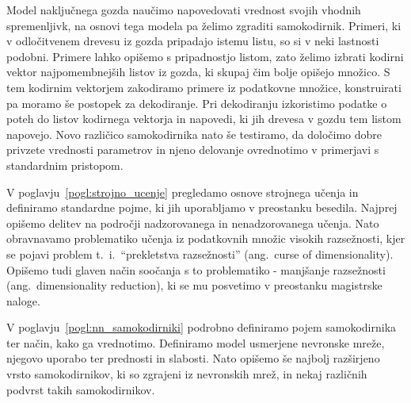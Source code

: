 \documentclass[12pt,a4paper,twoside]{article}
\theoremstyle{definition} %
\theoremstyle{plain} %
\numberwithin{equation}{section}  %
\begin{document}
Model naključnega gozda naučimo napovedovati vrednost svojih vhodnih spremenljivk, na osnovi tega modela pa želimo zgraditi samokodirnik.
Primeri, ki v odločitvenem drevesu iz gozda pripadajo istemu listu, so si v neki lastnosti podobni.
Primere lahko opišemo s pripadnostjo listom, zato želimo izbrati kodirni vektor najpomembnejših listov iz gozda, ki skupaj čim bolje opišejo množico.
S tem kodirnim vektorjem zakodiramo primere iz podatkovne množice, konstruirati pa moramo še postopek za dekodiranje.
Pri dekodiranju izkoristimo podatke o poteh do listov kodirnega vektorja in napovedi, ki jih drevesa v gozdu tem listom napovejo.
Novo različico samokodirnika nato še testiramo, da določimo dobre privzete vrednosti parametrov in njeno delovanje ovrednotimo v primerjavi s standardnim pristopom.


V poglavju~\ref{pogl:strojno_ucenje} pregledamo osnove strojnega učenja in definiramo standardne pojme, ki jih uporabljamo v preostanku besedila. 
Najprej opišemo delitev na področji nadzorovanega in nenadzorovanega učenja.
Nato obravnavamo problematiko učenja iz podatkovnih množic visokih razsežnosti, kjer se pojavi problem t.~i.~``prekletstva razsežnosti'' (ang.~curse of dimensionality). 
Opišemo tudi glaven način soočanja s to problematiko - manjšanje razsežnosti (ang.~dimensionality reduction), ki se mu posvetimo v preostanku magistrske naloge.

V poglavju~\ref{pogl:nn_samokodirniki} podrobno definiramo pojem samokodirnika ter način, kako ga vrednotimo.
Definiramo model usmerjene nevronske mreže, njegovo uporabo ter prednosti in slabosti.
Nato opišemo še najbolj razširjeno vrsto samokodirnikov, ki so zgrajeni iz nevronskih mrež, in nekaj različnih podvrst takih samokodirnikov.
\end{document}
